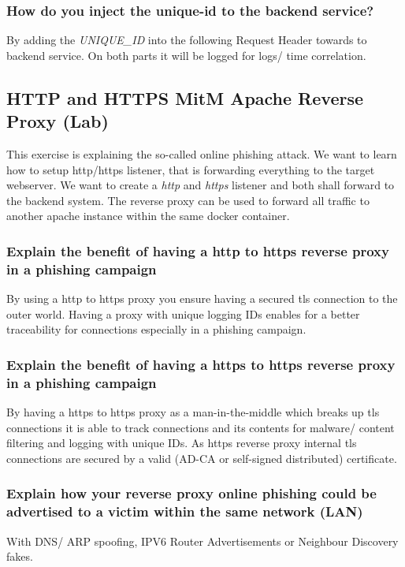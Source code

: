 \subsubsection{How do you inject the unique-id to the backend service?}
By adding the \textit{UNIQUE\_ID} into the following Request Header towards to backend service. On both parts it will be logged for logs/ time correlation.

\newpage

\subsection{HTTP and HTTPS MitM Apache Reverse Proxy (Lab)}
This exercise is explaining the so-called online phishing attack. We want to learn how to setup http/https listener, that is forwarding everything to the target webserver. We want to create a \textit{http} and \textit{https} listener and both shall forward to the backend system.
The reverse proxy can be used to forward all traffic to another apache instance within the same docker container.

\subsubsection{Explain the benefit of having a http to https reverse proxy in a phishing campaign}
By using a http to https proxy you ensure having a secured tls connection to the outer world. Having a proxy with unique logging IDs enables for a better traceability for connections especially in a phishing campaign.

\subsubsection{Explain the benefit of having a https to https reverse proxy in a phishing campaign}
By having a https to https proxy as a man-in-the-middle which breaks up tls connections it is able to track connections and its contents for malware/ content filtering and logging with unique IDs. As https reverse proxy internal tls connections are secured by a valid (AD-CA or self-signed distributed) certificate.

\subsubsection{Explain how your reverse proxy online phishing could be advertised to a victim within the same network (LAN)}
With DNS/ ARP spoofing, IPV6 Router Advertisements or Neighbour Discovery fakes.

